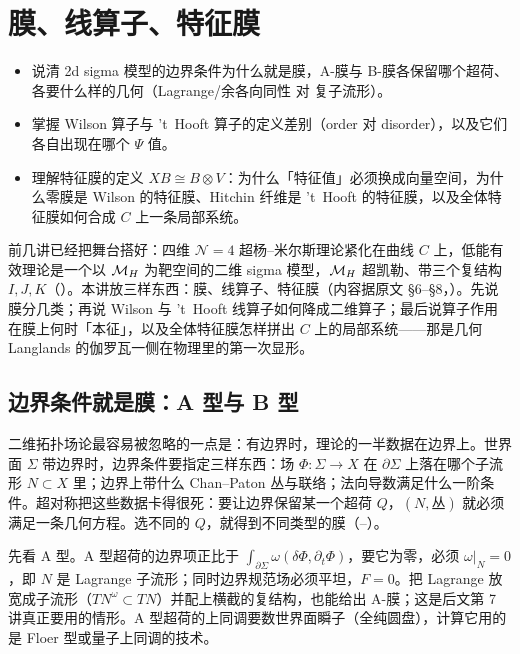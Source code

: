 
\section{膜、线算子、特征膜}
\label{sec:branes}

\begin{goals}
\begin{itemize}
\item 说清 2d sigma 模型的边界条件为什么就是膜，A-膜与 B-膜各保留哪个超荷、各要什么样的几何（Lagrange/余各向同性 对 复子流形）。
\item 掌握 Wilson 算子与 't~Hooft 算子的定义差别（order 对 disorder），以及它们各自出现在哪个 $\Psi$ 值。
\item 理解特征膜的定义 $XB\cong B\otimes V$：为什么「特征值」必须换成向量空间，为什么零膜是 Wilson 的特征膜、Hitchin 纤维是 't~Hooft 的特征膜，以及全体特征膜如何合成 $C$ 上一条局部系统。
\end{itemize}
\end{goals}

前几讲已经把舞台搭好：四维 $\mathcal N=4$ 超杨--米尔斯理论紧化在曲线 $C$ 上，低能有效理论是一个以 $\mathcal{M}_{H}$ 为靶空间的二维 sigma 模型，$\mathcal{M}_{H}$ 超凯勒、带三个复结构 $I,J,K$（）。本讲放三样东西：膜、线算子、特征膜（内容据原文 \S6--\S8，\cite{kw06}）。先说膜分几类；再说 Wilson 与 't~Hooft 线算子如何降成二维算子；最后说算子作用在膜上何时「本征」，以及全体特征膜怎样拼出 $C$ 上的局部系统——那是几何 Langlands 的伽罗瓦一侧在物理里的第一次显形。

\subsection{边界条件就是膜：A 型与 B 型}

二维拓扑场论最容易被忽略的一点是：有边界时，理论的一半数据在边界上。世界面 $\Sigma$ 带边界时，边界条件要指定三样东西：场 $\Phi:\Sigma\to X$ 在 $\partial\Sigma$ 上落在哪个子流形 $N\subset X$ 里；边界上带什么 Chan--Paton 丛与联络；法向导数满足什么一阶条件。超对称把这些数据卡得很死：要让边界保留某一个超荷 $Q$，$(N,\text{丛})$ 就必须满足一条几何方程。选不同的 $Q$，就得到不同类型的膜（--）。

先看 A 型。A 型超荷的边界项正比于 $\int_{\partial\Sigma}\omega(\delta\Phi,\partial_t\Phi)$，要它为零，必须 $\omega|_N=0$，即 $N$ 是 Lagrange 子流形；同时边界规范场必须平坦，$F=0$。把 Lagrange 放宽成子流形（$TN^{\omega}\subset TN$）并配上横截的复结构，也能给出 A-膜；这是后文第 7 讲真正要用的情形。A 型超荷的上同调要数世界面瞬子（全纯圆盘），计算它用的是 Floer 型或量子上同调的技术。

